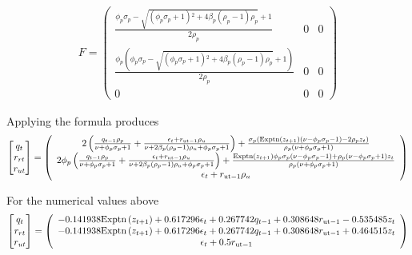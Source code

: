 \documentclass[12pt]{article}
\begin{document}
\begin{gather*}
  F=    \left(
   \begin{array}{ccc}
    \frac{\phi _p \sigma _p-\sqrt{\left(\phi _p \sigma _p+1\right){}^2+4 \beta
      _p \left(\rho _p-1\right) \rho _p}+1}{2 \rho _p} & 0 & 0 \\
    \frac{\phi _p \left(\phi _p \sigma _p-\sqrt{\left(\phi _p \sigma
      _p+1\right){}^2+4 \beta _p \left(\rho _p-1\right) \rho _p}+1\right)}{2
      \rho _p} & 0 & 0 \\
    0 & 0 & 0
   \end{array}
   \right)
\end{gather*}

Applying the formula produces
\begin{gather*}
\begin{bmatrix} q_t\\r_{rt}\\r_{ut} \end{bmatrix}=      \left(
   \begin{array}{c}
    2 \left(\frac{q_{t-1} \rho _p}{\nu +\phi _p \sigma _p+1}+\frac{\epsilon
      _t+r_{\text{ut}-1} \rho _u}{\nu +2 \beta _p \left(\rho _p-1\right) \rho
      _u+\phi _p \sigma _p+1}\right)+\frac{\sigma _p
      \left(\text{Exptn}\left(z_{t+1}\right) \left(\nu -\phi _p \sigma
      _p-1\right)-2 \rho _p z_t\right)}{\rho _p \left(\nu +\phi _p \sigma
      _p+1\right)} \\
    2 \phi _p \left(\frac{q_{t-1} \rho _p}{\nu +\phi _p \sigma
      _p+1}+\frac{\epsilon _t+r_{\text{ut}-1} \rho _u}{\nu +2 \beta _p
      \left(\rho _p-1\right) \rho _u+\phi _p \sigma
      _p+1}\right)+\frac{\text{Exptn}\left(z_{t+1}\right) \phi _p \sigma _p
      \left(\nu -\phi _p \sigma _p-1\right)+\rho _p \left(\nu -\phi _p \sigma
      _p+1\right) z_t}{\rho _p \left(\nu +\phi _p \sigma _p+1\right)} \\
    \epsilon _t+r_{\text{ut}-1} \rho _u
   \end{array}
   \right)
\end{gather*}

For the numerical values above
\begin{gather*}
\begin{bmatrix} q_t\\r_{rt}\\r_{ut} \end{bmatrix}=    \left(
   \begin{array}{c}
    -0.141938 \text{Exptn}\left(z_{t+1}\right)+0.617296 \epsilon _t+0.267742
      q_{t-1}+0.308648 r_{\text{ut}-1}-0.535485 z_t \\
    -0.141938 \text{Exptn}\left(z_{t+1}\right)+0.617296 \epsilon _t+0.267742
      q_{t-1}+0.308648 r_{\text{ut}-1}+0.464515 z_t \\
    \epsilon _t+0.5 r_{\text{ut}-1}
   \end{array}
   \right)
\end{gather*}
\end{document}
